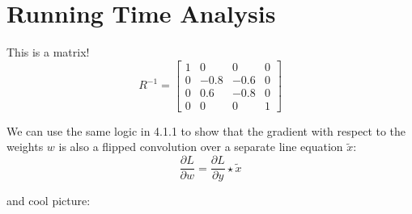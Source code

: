 \documentclass[11pt]{article}
\begin{document}
\section{Running Time Analysis}
This is a matrix!
$$R^{-1} = \begin{bmatrix}
       1       & 0           & 0         & 0\\[0.3em]
       0       & -0.8        & -0.6      & 0\\[0.3em]
       0       &  0.6        & -0.8      & 0\\[0.3em]
       0       & 0           & 0         & 1
     \end{bmatrix}$$
     
We can use the same logic in 4.1.1 to show that the gradient with respect to the weights $w$ is also a flipped convolution over a separate line equation $\tilde{x}$:
\[ \frac{\partial L}{\partial w} = \frac{\partial L}{\partial y} \star \tilde{x} \]

and cool picture:

\end{document}
